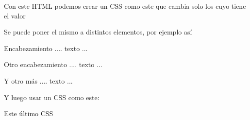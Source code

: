 \documentclass[letterpaper,10pt,spanish]{sphinxmanual}
\begin{document}
Con este HTML podemos crear un CSS como este que cambia solo los  cuyo  tiene el valor 

\begin{sphinxVerbatim}[commandchars=\\\{\}]
     
\end{sphinxVerbatim}

Se puede poner el mismo  a distintos elementos, por ejemplo así

\begin{sphinxVerbatim}[commandchars=\\\{\}]
 Encabezamiento
.... texto ...

Otro encabezamiento
.... texto ...

 Y otro más
.... texto ...
\end{sphinxVerbatim}

Y luego usar un CSS como este:

\begin{sphinxVerbatim}[commandchars=\\\{\}]
 
     
\end{sphinxVerbatim}

Este último CSS 

\begin{sphinxVerbatim}[commandchars=\\\{\}]
     
\end{sphinxVerbatim}
\end{document}
